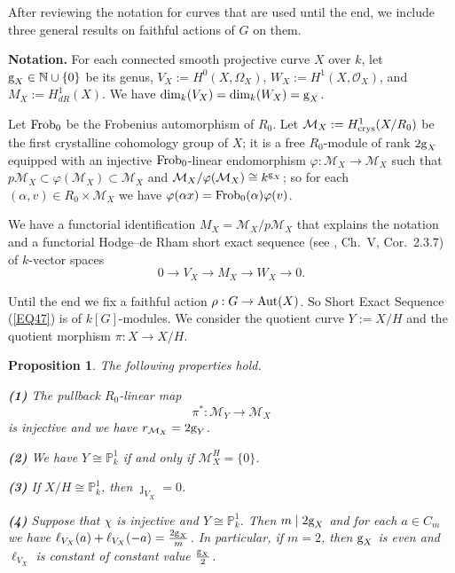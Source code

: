 \documentclass[11pt]{amsart}
\newtheorem{proposition}[theorem]{Proposition}
\def\Aut{\textup{Aut}}
\def\crys{\textup{crys}}
\def\Frob{\textup{Frob}}
\begin{document}
After reviewing the notation for curves that are used until the end, we include three general results on faithful actions of $G$ on them.

{\bf Notation.} For each connected smooth projective curve $X$ over $k$, let $\textup{g}_X\in\mathbb N\cup\{0\}$ be its genus, $V_X:=H^0(X,\Omega_X)$, $W_X:=H^1(X,\mathcal O_X)$, and $M_X:=H^1_{dR}(X)$. We have $\dim_k(V_X)=\dim_k(W_X)=\textup{g}_X$. 

Let $\Frob_0$ be the Frobenius automorphism of $R_0$. Let $\mathcal M_X:=H^1_{\crys}(X/R_0)$ be the first crystalline cohomology group of $X$; it is a free $R_0$-module of rank $2\textup{g}_X$ equipped with an injective $\Frob_0$-linear endomorphism $\varphi:\mathcal M_X\rightarrow\mathcal M_X$ such that $p\mathcal M_X\subset\varphi(\mathcal M_X)\subset\mathcal M_X$ and $\mathcal M_X/\varphi(\mathcal M_X)\cong k^{\textup{g}_X}$; so for each $(\alpha,v)\in R_0\times\mathcal M_X$ we have $\varphi(\alpha x)=\Frob_0(\alpha)\varphi(v)$. 

We have a functorial identification $M_X=\mathcal M_X/p\mathcal M_X$ that explains the notation and a functorial Hodge--de Rham short exact sequence (see \cite{Be}, Ch.\ V, Cor.\ 2.3.7) of $k$-vector spaces
\begin{equation}\label{EQ47}
0\rightarrow V_X\rightarrow M_X\rightarrow W_X\rightarrow 0.
\end{equation}

Until the end we fix a faithful action $\rho:G\rightarrow\Aut(X)$. So Short Exact Sequence (\ref{EQ47}) is of $k[G]$-modules. We consider the quotient curve $Y:=X/H$ and the quotient morphism $\pi:X\rightarrow X/H$.

\begin{proposition}\label{P4}
The following properties hold.

\medskip
{\bf (1)} The pullback $R_0$-linear map $$\pi^*:\mathcal M_Y\rightarrow\mathcal M_X$$ is injective and we have $r_{\mathcal M_X}=2\textup{g}_Y$.

\smallskip
{\bf (2)} We have $Y\cong\mathbb P^1_k$ if and only if $\mathcal M_X^H=\{0\}$.

\smallskip
{\bf (3)} If $X/H\cong\mathbb P^1_k$, then $\jmath_{V_X}=0$.

\smallskip
{\bf (4)} Suppose that $\chi$ is injective and $Y\cong\mathbb P^1_k$. Then $m\mid 2\textup{g}_X$ and for each $a\in C_m$ we have $\ell_{V_X}(a)+\ell_{V_X}(-a)=\frac{2\textup{g}_X}{m}$. In particular, if $m=2$, then $\textup{g}_X$ is even and $\ell_{V_X}$ is constant of constant value $\frac{\textup{g}_X}{2}$.
\end{proposition}
\end{document}
